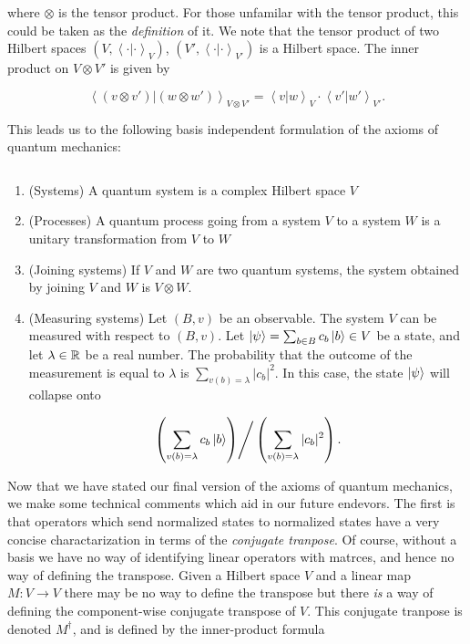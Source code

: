 where $\otimes$ is the tensor product. For those unfamilar with the tensor product, this could be taken as the \textit{definition} of it. We note that the tensor product of two Hilbert spaces $(V,\left<\cdot|\cdot\right>_V)$, $(V',\left<\cdot|\cdot\right>_{V'})$ is a Hilbert space. The inner product on $V\otimes V'$ is given by

$$\left<(v\otimes v')| (w\otimes w')\right>_{V\otimes V'}=\left<v | w\right>_V\cdot \left<v' | w'\right>_{V'}.$$

This leads us to the following basis independent formulation of the axioms of quantum mechanics:

\begin{definition} $\,$

\begin{enumerate}
\item (Systems) A quantum system is a complex Hilbert space $V$
\item (Processes) A quantum process going from a system $V$ to a system $W$ is a unitary transformation from $V$ to $W$
\item (Joining systems) If $V$ and $W$ are two quantum systems, the system obtained by joining $V$ and $W$ is $V\otimes W$.
\item (Measuring systems) Let $(B,v)$ be an observable. The system $V$ can be measured with respect to $(B,v)$. Let $\ket{\psi}=\sum_{b\in B}c_b \ket{b}\in V$ be a state, and let $\lambda\in \mathbb{R}$ be a real number. The probability that the outcome of the measurement is equal to $\lambda$ is $\sum_{v(b)=\lambda}|c_b|^2$. In this case, the state $\ket{\psi}$ will collapse onto

$$\left.\left(\sum_{v(b)=\lambda}c_b \ket{b}\right)\right/ \left(\sum_{v(b)=\lambda}|c_b|^2\right).$$
\end{enumerate}

\raggedleft\qedsymbol{}
\end{definition}

Now that we have stated our final version of the axioms of quantum mechanics, we make some technical comments which aid in our future endevors. The first is that operators which send normalized states to normalized states have a very concise charactarization in terms of the \textit{conjugate tranpose}. Of course, without a basis we have no way of identifying linear operators with matrces, and hence no way of defining the transpose. Given a Hilbert space $V$ and a linear map $M:V\to V$ there may be no way to define the transpose but there \textit{is} a way of defining the component-wise conjugate transpose of $V$. This conjugate tranpose is denoted $M^\dagger$, and is defined by the inner-product formula

